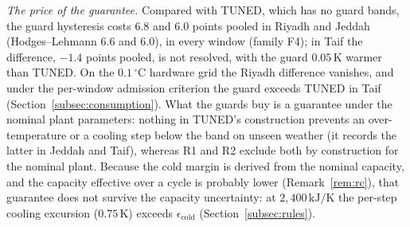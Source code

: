 \documentclass[3p,twocolumn,number]{elsarticle}
\begin{document}
\emph{The price of the guarantee.} Compared with TUNED, which has no guard bands, the guard hysteresis costs $6.8$ and $6.0$ points pooled in Riyadh and Jeddah (Hodges--Lehmann $6.6$ and $6.0$), in every window (family F4); in Taif the difference, $-1.4$ points pooled, is not resolved, with the guard $0.05\,$K warmer than TUNED. On the $0.1\,^\circ$C hardware grid the Riyadh difference vanishes, and under the per-window admission criterion the guard exceeds TUNED in Taif (Section~\ref{subsec:consumption}). What the guards buy is a guarantee under the nominal plant parameters: nothing in TUNED's construction prevents an over-temperature or a cooling step below the band on unseen weather (it records the latter in Jeddah and Taif), whereas R1 and R2 exclude both by construction for the nominal plant. Because the cold margin is derived from the nominal capacity, and the capacity effective over a cycle is probably lower (Remark~\ref{rem:rc}), that guarantee does not survive the capacity uncertainty: at $2{,}400\,\text{kJ/K}$ the per-step cooling excursion ($0.75\,$K) exceeds $\epsilon_{\mathrm{cold}}$ (Section~\ref{subsec:rules}).
\end{document}
